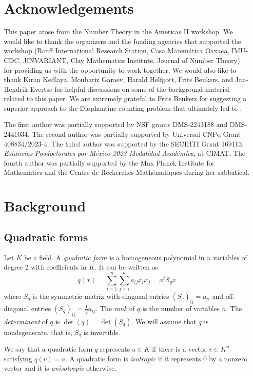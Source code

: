 \documentclass[12pt]{amsart}
\theoremstyle{plain}
\begin{document}
\section*{Acknowledgements}
This paper arose from the Number Theory in the Americas II workshop. We would like to thank the organizers and the funding agencies that supported the workshop (Banff International Research Station, Casa Matem\'atica Oaxaca, IMU-CDC, JINVARIANT, Clay Mathematics Institute, Journal of Number Theory) for providing us with the opportunity to work together. We would also like to thank Kiran Kedlaya,
Moubariz Garaev, Harald Helfgott, Frits Beukers, and Jan-Hendrik Evertse for helpful discussions on some of the background material related to this paper. We are extremely grateful to Frits Beukers for suggesting a superior approach to the Diophantine counting problem that ultimately led to . 

The first author was partially supported by NSF grants DMS-2243188 and DMS-2441034. The second author was partially supported by Universal CNPq Grant 408834/2023-4. The third author was supported by the SECIHTI Grant 169113, \emph{Estancias Posdoctorales por México 2023-Modalidad Académica}, at CIMAT. The fourth author was partially supported by the Max Planck Institute for Mathematics and the Centre de Recherches Mathématiques during her sabbatical. 


\section{Background}\label{s:background}

\subsection{Quadratic forms}
Let $K$ be a field. A \emph{quadratic form} is a homogeneous polynomial in $n$ variables of degree 2 with coefficients in $K$. It can be written as 
\[ q(x)=\sum_{i=1}^n \sum_{j=i}^n a_{ij}x_i x_j = x^t S_q x \] where $S_q$ is the symmetric matrix with diagonal entries $(S_q)_{ii}=a_{ii}$ and off-diagonal entries $(S_q)_{ij}=\frac{1}{2}a_{ij}$. The \emph{rank} of $q$ is the number of variables $n$. The \emph{determinant} of $q$ is $\det(q)=\det(S_q)$. We will assume that $q$ is nondegenerate, that is, $S_q$ is invertible.

We say that a quadratic form $q$ represents $a\in K$ if there is a vector $v\in K^n$ satisfying $q(v)=a$. A quadratic form is \emph{isotropic} if it represents 0 by a nonzero vector and it is \emph{anisotropic} otherwise.
\end{document}
